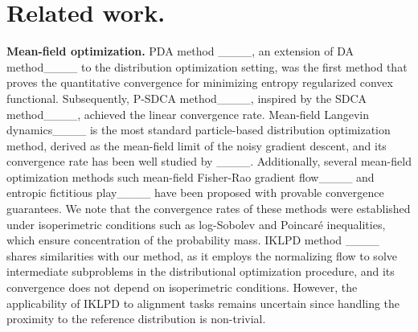 \section{Related work.}
\vspace{-1mm}
\textbf{Mean-field optimization.}\quad
PDA method ____, an extension of DA method____ to the distribution optimization setting, was the first method that proves the quantitative convergence for minimizing entropy regularized convex functional. Subsequently, P-SDCA method____, inspired by the SDCA method____, achieved the linear convergence rate. Mean-field Langevin dynamics____ is the most standard particle-based distribution optimization method, derived as the mean-field limit of the noisy gradient descent, and its convergence rate has been well studied by ____. Additionally, several mean-field optimization methods such mean-field Fisher-Rao gradient flow____ and entropic fictitious play____ have been proposed with provable convergence guarantees. We note that the convergence rates of these methods were established under isoperimetric conditions such as log-Sobolev and Poincar\'e inequalities, which ensure concentration of the probability mass.
IKLPD method ____ shares similarities with our method, as it employs the normalizing flow to solve intermediate subproblems in the distributional optimization procedure, and its convergence does not depend on isoperimetric conditions. However, the applicability of IKLPD to alignment tasks remains uncertain since handling the proximity to the reference distribution is non-trivial.


